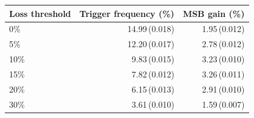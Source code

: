 \begin{tabular}{@{}lrr@{}}
\toprule
Loss threshold & Trigger frequency (\%) & MSB gain (\%) \\ \midrule
0\% & 14.99\,(0.018) & 1.95\,(0.012) \\
5\% & 12.20\,(0.017) & 2.78\,(0.012) \\
10\% & 9.83\,(0.015) & 3.23\,(0.010) \\
15\% & 7.82\,(0.012) & 3.26\,(0.011) \\
20\% & 6.15\,(0.013) & 2.91\,(0.010) \\
30\% & 3.61\,(0.010) & 1.59\,(0.007) \\
\bottomrule
\end{tabular}
